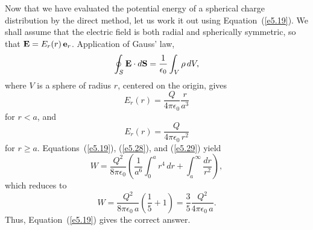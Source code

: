 Now that we have evaluated the potential energy of a spherical charge distribution
by the direct method, let us work it out using Equation~(\ref{e5.19}). We shall assume that the
electric field is both radial and spherically symmetric, so that ${\bf E} = E_r(r)\,
{\bf e}_r$. Application of Gauss' law,
\begin{equation}
\oint_S {\bf E} \cdot d{\bf S} = \frac{1}{\epsilon_0} \int_V \rho \,dV,
\end{equation}
where $V$ is a sphere of radius $r$, centered on the origin, gives
\begin{equation}\label{e5.28}
E_r(r) = \frac{Q}{4\pi\epsilon_0} \frac{r}{a^3}
\end{equation}
for $r<a$, and
\begin{equation}\label{e5.29}
E_r(r) = \frac{Q}{4\pi\epsilon_0\,r^2}
\end{equation}
for $r\geq a$. Equations~(\ref{e5.19}), (\ref{e5.28}), and (\ref{e5.29}) yield
\begin{equation}
W = \frac{Q^2}{8\pi\epsilon_0} \left(
\frac{1}{a^6} \int_0^a r^4\,dr + \int_a^\infty \frac{dr}{r^2} \right),
\end{equation}
which reduces to
\begin{equation}
W =  \frac{Q^2}{8\pi\epsilon_0\, a} \left( \frac{1}{5} + 1\right)=  
\frac{3}{5} \frac{Q^2}{4\pi\epsilon_0 \,a}.
\end{equation}
Thus, Equation~(\ref{e5.19}) gives the correct answer. 

